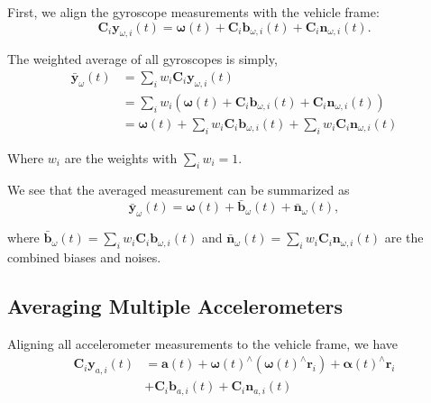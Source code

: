 \documentclass[conference]{IEEEtran}
\begin{document}
First, we align the gyroscope measurements with the vehicle frame:
\begin{equation}
    \textbf{C}_{i} \textbf{y}_{\omega,i}(t) = \bm{\omega}(t) + \textbf{C}_{i} \textbf{b}_{\omega, i}(t) + \textbf{C}_{i} \textbf{n}_{\omega,i}(t).
\end{equation}

\noindent The weighted average of all gyroscopes is simply,
\begin{equation}
\begin{split}
    \bar{\textbf{y}}_\omega(t) &= \sum_i{w_i \textbf{C}_{i} \textbf{y}_{\omega,i}(t)} \\
    &= \sum_i{w_i \left( \bm{\omega}(t) + \textbf{C}_{i} \textbf{b}_{\omega,i}(t) + \textbf{C}_{i} \textbf{n}_{\omega,i}(t) \right)} \\
    &= \bm{\omega}(t) + \sum_i{w_i \textbf{C}_{i} \textbf{b}_{\omega,i}(t)} + \sum_i{w_i \textbf{C}_{i} \textbf{n}_{\omega,i}(t)}
\end{split}
\end{equation}

\noindent Where $w_i$ are the weights with $\sum_i{w_i} = 1$.

We see that the averaged measurement can be summarized as
\begin{equation}
    \bar{\textbf{y}}_\omega(t) = \bm{\omega}(t) + \bar{\textbf{b}}_\omega(t) + \bar{\textbf{n}}_\omega(t),
\end{equation}

\noindent where $\bar{\textbf{b}}_\omega(t) = \sum_i{w_i \textbf{C}_{i} \textbf{b}_{\omega,i}(t)}$ and $\bar{\textbf{n}}_\omega(t) = \sum_i{w_i \textbf{C}_{i} \textbf{n}_{\omega,i}(t)}$ are the combined biases and noises.

\subsection{Averaging Multiple Accelerometers}

Aligning all accelerometer measurements to the vehicle frame, we have
\begin{equation}\label{eqn_accel}
\begin{split}
    \textbf{C}_{i} \textbf{y}_{a,i}(t) &= \textbf{a}(t) + \bm{\omega}(t)^\wedge (\bm{\omega}(t)^\wedge \textbf{r}_i) + \bm{\alpha}(t)^\wedge \textbf{r}_i \\
    &+ \textbf{C}_{i} \textbf{b}_{a,i}(t) + \textbf{C}_{i} \textbf{n}_{a,i}(t)
\end{split}
\end{equation}
\end{document}
